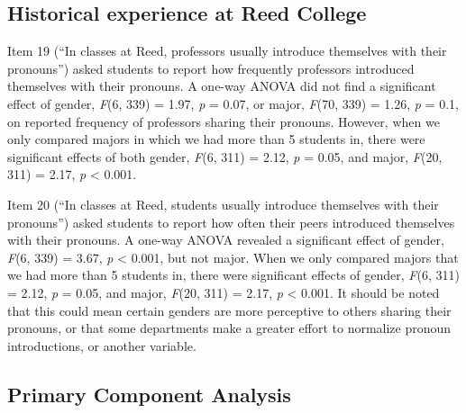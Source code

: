 \documentclass[12pt,twoside]{reedthesis}
\begin{document}
\hypertarget{historical-experience-at-reed-college}{%
\subsection{Historical experience at Reed College}\label{historical-experience-at-reed-college}}

Item 19 (``In classes at Reed, professors usually introduce themselves with their pronouns'') asked students to report how frequently professors introduced themselves with their pronouns. A one-way ANOVA did not find a significant effect of gender, \emph{F}(6, 339) = 1.97, \emph{p} = 0.07, or major, \emph{F}(70, 339) = 1.26, \emph{p} = 0.1, on reported frequency of professors sharing their pronouns. However, when we only compared majors in which we had more than 5 students in, there were significant effects of both gender, \emph{F}(6, 311) = 2.12, \emph{p} = 0.05, and major, \emph{F}(20, 311) = 2.17, \emph{p} \textless{} 0.001.

Item 20 (``In classes at Reed, students usually introduce themselves with their pronouns'') asked students to report how often their peers introduced themselves with their pronouns. A one-way ANOVA revealed a significant effect of gender, \emph{F}(6, 339) = 3.67, \emph{p} \textless{} 0.001, but not major. When we only compared majors that we had more than 5 students in, there were significant effects of gender, \emph{F}(6, 311) = 2.12, \emph{p} = 0.05, and major, \emph{F}(20, 311) = 2.17, \emph{p} \textless{} 0.001. It should be noted that this could mean certain genders are more perceptive to others sharing their pronouns, or that some departments make a greater effort to normalize pronoun introductions, or another variable.

\hypertarget{primary-component-analysis}{%
\subsection{Primary Component Analysis}\label{primary-component-analysis}}
\end{document}
